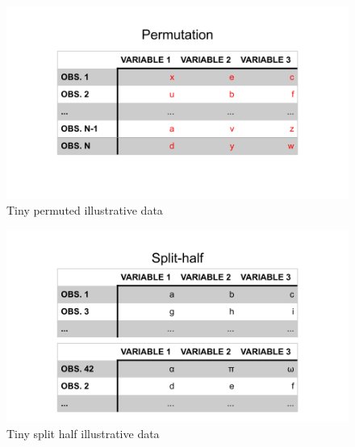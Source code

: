 \documentclass[
  ignorenonframetext,
]{beamer}
\begin{document}
\begin{frame}

\begin{figure}
\centering
\includegraphics{../Images/permutation_data.png}
\caption{Tiny permuted illustrative data}
\end{figure}

\end{frame}

\begin{frame}

\begin{figure}
\centering
\includegraphics{../Images/split_half_data.png}
\caption{Tiny split half illustrative data}
\end{figure}

\end{frame}
\end{document}

